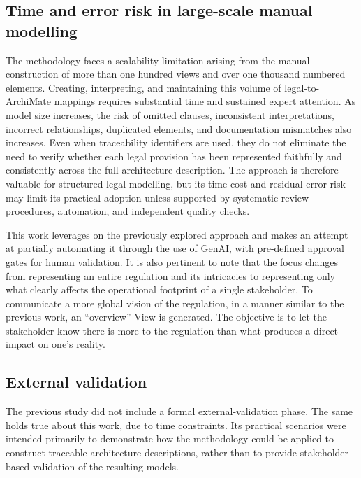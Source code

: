 \subsection{Time and error risk in large-scale manual modelling}

The methodology faces a scalability limitation arising from the manual construction of more than one hundred views and over one thousand numbered elements. Creating, interpreting, and maintaining this volume of legal-to-ArchiMate mappings requires substantial time and sustained expert attention. As model size increases, the risk of omitted clauses, inconsistent interpretations, incorrect relationships, duplicated elements, and documentation mismatches also increases. Even when traceability identifiers are used, they do not eliminate the need to verify whether each legal provision has been represented faithfully and consistently across the full architecture description. The approach is therefore valuable for structured legal modelling, but its time cost and residual error risk may limit its practical adoption unless supported by systematic review procedures, automation, and independent quality checks. 

This work leverages on the previously explored approach and makes an attempt at partially automating it through the use of \ac{GenAI}, with pre-defined approval gates for human validation. It is also pertinent to note that the focus changes from representing an entire regulation and its intricacies to representing only what clearly affects the operational footprint of a single stakeholder. To communicate a more global vision of the regulation, in a manner similar to the previous work, an ``overview'' View is generated. The objective is to let the stakeholder know there is more to the regulation than what produces a direct impact on one's reality.

\subsection{External validation}

The previous study did not include a formal external-validation phase. The same holds true about this work, due to time constraints. Its practical scenarios were intended primarily to demonstrate how the methodology could be applied to construct traceable architecture descriptions, rather than to provide stakeholder-based validation of the resulting models.

